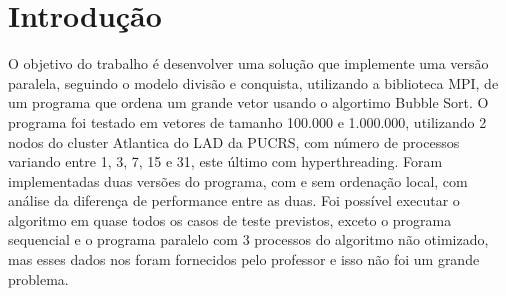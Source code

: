 \section{Introdução}

O objetivo do trabalho é desenvolver uma solução que implemente uma versão paralela, seguindo o modelo divisão e conquista, utilizando a biblioteca MPI, de um programa que ordena um grande vetor usando o algortimo Bubble Sort. O programa foi testado em vetores de tamanho 100.000 e 1.000.000, utilizando 2 nodos do cluster Atlantica do LAD da PUCRS, com número de processos variando entre 1, 3, 7, 15 e 31, este último com hyperthreading. Foram implementadas duas versões do programa, com e sem ordenação local, com análise da diferença de performance entre as duas. Foi possível executar o algoritmo em quase todos os casos de teste previstos, exceto o programa sequencial e o programa paralelo com 3 processos do algoritmo não otimizado, mas esses dados nos foram fornecidos pelo professor e isso não foi um grande problema.